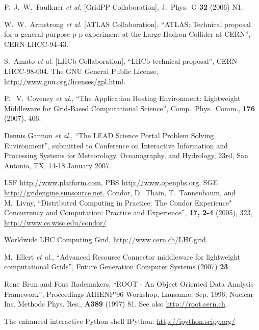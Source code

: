 \documentclass{elsart}
\begin{document}
\begin{thebibliography}{00}

  P.~J.~W.~Faulkner {\it et al.}  [GridPP Collaboration],
  J.\ Phys.\ G {\bf 32} (2006) N1.

  W.~W.~Armstrong {\it et al.}  [ATLAS Collaboration],
  ``ATLAS: Technical proposal for a general-purpose p p experiment at the
  Large Hadron Collider at CERN'', CERN-LHCC-94-43.

  S.~Amato {\it et al.}  [LHCb Collaboration],
  ``LHCb technical proposal'', CERN-LHCC-98-004.
  The GNU General Public License,
  \url{http://www.gnu.org/licenses/gpl.html}.

  P.~ V.~Coveney {\it et al.}, ``The Application Hosting Environment:
  Lightweight Middleware for Grid-Based Computational Science'',
  Comp.~Phys.~Comm., {\bf 176} (2007), 406.

  Dennis Gannon {\it et al.}, ``The LEAD Science Portal Problem Solving
  Environment'', submitted to Conference on Interactive Information and
  Processing Systems for Meteorology, Oceanography, and Hydrology, 23rd, San
  Antonio, TX, 14-18 January 2007.


  LSF \url{http://www.platform.com}, PBS \url{http://www.openpbs.org}, SGE
  \url{http://gridengine.sunsource.net}, Condor, D.~Thain, T.~Tannenbaum, and
  M.~Livny, ``Distributed Computing in Practice: The Condor Experience"
  Concurrency and Computation: Practice and Experience'', {\bf 17, 2-4}
  (2005), 323, \url{http://www.cs.wisc.edu/condor/}

Worldwide LHC Computing Grid, \url{http://www.cern.ch/LHCgrid}.

  M.~Ellert {\it et al.}, ``Advanced Resource Connector middleware for
  lightweight computational Grids'', Future Generation Computer Systems
  (2007) {\bf23}.
  
  Rene Brun and Fons Rademakers, ``ROOT - An Object Oriented Data Analysis
  Framework'', Proceedings AIHENP'96 Workshop, Lausanne, Sep. 1996, Nuclear
  Ins. Methods Phys. Res., {\bf A389} (1997) 81. See also
  \url{http://root.cern.ch}.

 The enhanced interactive Python shell IPython.
  \url{http://ipython.scipy.org/}


\end{thebibliography}
\end{document}
